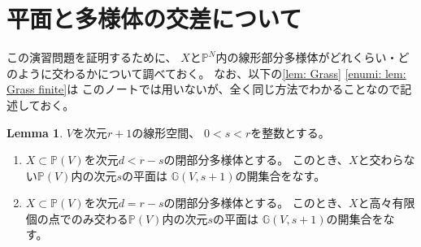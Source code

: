 \documentclass[uplatex]{jsarticle}
\theoremstyle{definition}
\newtheorem{lem}[lem]{Lemma}
\newcommand{\G}{\mathbb{G}}
\renewcommand{\P}{\mathbb{P}}
\newcommand{\lt}{<}
\begin{document}
\section{平面と多様体の交差について}

この演習問題を証明するために、
\(X\)と\(\P^N\)内の線形部分多様体がどれくらい・どのように交わるかについて調べておく。
なお、以下の\autoref{lem: Grass} \ref{enumi: lem: Grass finite}は
このノートでは用いないが、全く同じ方法でわかることなので記述しておく。


\begin{lem}\label{lem: Grass}
  \(V\)を次元\(r+1\)の線形空間、
  \(0 \lt s \lt r\)を整数とする。
  \begin{enumerate}
    \item \label{enumi: lem: Grass empty}
    \(X\subset \P(V)\)を次元\(d \lt r-s\)の閉部分多様体とする。
    このとき、\(X\)と交わらない\(\P(V)\)内の次元\(s\)の平面は
    \(\G(V,s+1)\)の開集合をなす。
    \item \label{enumi: lem: Grass finite}
    \(X\subset \P(V)\)を次元\(d = r-s\)の閉部分多様体とする。
    このとき、\(X\)と高々有限個の点でのみ交わる\(\P(V)\)内の次元\(s\)の平面は
    \(\G(V,s+1)\)の開集合をなす。
  \end{enumerate}
\end{lem}
\end{document}
